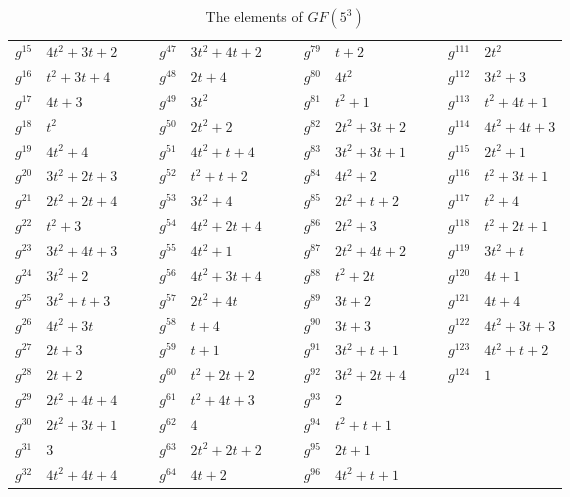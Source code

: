 \documentclass[12pt,a4paper,titlepage]{article}
\begin{document}
\begin{table}[h!]
\begin{center}
\begin{tabular}{llllllllllllll}
$g^{15}$ & $4t^2 + 3t + 2$ &  &  & $g^{47}$ & $3t^2 + 4t + 2$ &  &  & $g^{79}$ & $t + 2$         &  &  & $g^{111}$ & $2t^2$          \\
$g^{16}$ & $t^2 + 3t + 4$  &  &  & $g^{48}$ & $2t + 4$        &  &  & $g^{80}$ & $4t^2$          &  &  & $g^{112}$ & $3t^2 + 3$      \\
$g^{17}$ & $4t + 3$        &  &  & $g^{49}$ & $3t^2$          &  &  & $g^{81}$ & $t^2 + 1$       &  &  & $g^{113}$ & $t^2 + 4t + 1$  \\
$g^{18}$ & $t^2$           &  &  & $g^{50}$ & $2t^2 + 2$      &  &  & $g^{82}$ & $2t^2 + 3t + 2$ &  &  & $g^{114}$ & $4t^2 + 4t + 3$ \\
$g^{19}$ & $4t^2 + 4$      &  &  & $g^{51}$ & $4t^2 + t + 4$  &  &  & $g^{83}$ & $3t^2 + 3t + 1$ &  &  & $g^{115}$ & $2t^2 + 1$      \\
$g^{20}$ & $3t^2 + 2t + 3$ &  &  & $g^{52}$ & $t^2 + t + 2$   &  &  & $g^{84}$ & $4t^2 + 2$      &  &  & $g^{116}$ & $t^2 + 3t + 1$  \\
$g^{21}$ & $2t^2 + 2t + 4$ &  &  & $g^{53}$ & $3t^2 + 4$      &  &  & $g^{85}$ & $2t^2 + t + 2$  &  &  & $g^{117}$ & $t^2 + 4$       \\
$g^{22}$ & $t^2 + 3$       &  &  & $g^{54}$ & $4t^2 + 2t + 4$ &  &  & $g^{86}$ & $2t^2 + 3$      &  &  & $g^{118}$ & $t^2 + 2t + 1$  \\
$g^{23}$ & $3t^2 + 4t + 3$ &  &  & $g^{55}$ & $4t^2 + 1$      &  &  & $g^{87}$ & $2t^2 + 4t + 2$ &  &  & $g^{119}$ & $3t^2 + t$      \\
$g^{24}$ & $3t^2 + 2$      &  &  & $g^{56}$ & $4t^2 + 3t + 4$ &  &  & $g^{88}$ & $t^2 + 2t$      &  &  & $g^{120}$ & $4t + 1$        \\
$g^{25}$ & $3t^2 + t + 3$  &  &  & $g^{57}$ & $2t^2 + 4t$     &  &  & $g^{89}$ & $3t + 2$        &  &  & $g^{121}$ & $4t + 4$        \\
$g^{26}$ & $4t^2 + 3t$     &  &  & $g^{58}$ & $t + 4$         &  &  & $g^{90}$ & $3t + 3$        &  &  & $g^{122}$ & $4t^2 + 3t + 3$ \\
$g^{27}$ & $2t + 3$        &  &  & $g^{59}$ & $t + 1$         &  &  & $g^{91}$ & $3t^2 + t + 1$  &  &  & $g^{123}$ & $4t^2 + t + 2$  \\
$g^{28}$ & $2t + 2$        &  &  & $g^{60}$ & $t^2 + 2t + 2$  &  &  & $g^{92}$ & $3t^2 + 2t + 4$ &  &  & $g^{124}$ & $1$             \\
$g^{29}$ & $2t^2 + 4t + 4$ &  &  & $g^{61}$ & $t^2 + 4t + 3$  &  &  & $g^{93}$ & $2$             &  &  &           &                 \\
$g^{30}$ & $2t^2 + 3t + 1$ &  &  & $g^{62}$ & $4$             &  &  & $g^{94}$ & $t^2 + t + 1$   &  &  &           &                 \\
$g^{31}$ & $3$             &  &  & $g^{63}$ & $2t^2 + 2t + 2$ &  &  & $g^{95}$ & $2t + 1$        &  &  &           &                 \\
$g^{32}$ & $4t^2 + 4t + 4$ &  &  & $g^{64}$ & $4t + 2$        &  &  & $g^{96}$ & $4t^2 + t + 1$  &  &  &           &                
\end{tabular}
	\caption{The elements of $GF(5^3)$}
\end{center}
\end{table}
\end{document}
